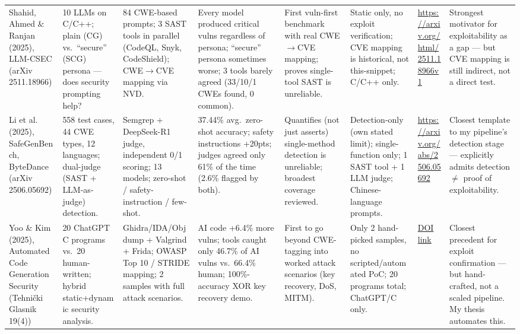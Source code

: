 \documentclass[10pt]{article}
\begin{document}
\begin{landscape}
\begin{longtable}{
  P{2.6cm}
  P{3.6cm}
  P{3.2cm}
  P{4.0cm}
  P{3.0cm}
  P{3.0cm}
  P{2.2cm}
  P{3.6cm}
}
Shahid, Ahmed \& Ranjan (2025), LLM-CSEC (arXiv 2511.18966)
&
10 LLMs on C/C++; plain (CG) vs.\ ``secure'' (SCG) persona --- does security prompting help?
&
84 CWE-based prompts; 3 SAST tools in parallel (CodeQL, Snyk, CodeShield); CWE$\to$CVE mapping via NVD.
&
Every model produced critical vulns regardless of persona; ``secure'' persona sometimes worse; 3 tools barely agreed (33/10/1 CWEs found, 0 common).
&
First vuln-first benchmark with real CWE$\to$CVE mapping; proves single-tool SAST is unreliable.
&
Static only, no exploit verification; CVE mapping is historical, not this-snippet; C/C++ only.
&
\url{https://arxiv.org/html/2511.18966v1}
&
Strongest motivator for exploitability as a gap --- but CVE mapping is still indirect, not a direct test.
\\[4pt]

Li et al. (2025), SafeGenBench, ByteDance (arXiv 2506.05692)
&
558 test cases, 44 CWE types, 12 languages; dual-judge (SAST + LLM-as-judge) detection.
&
Semgrep + DeepSeek-R1 judge, independent 0/1 scoring; 13 models; zero-shot / safety-instruction / few-shot.
&
37.44\% avg.\ zero-shot accuracy; safety instructions +20pts; judges agreed only 61\% of the time (2.6\% flagged by both).
&
Quantifies (not just asserts) single-method detection is unreliable; broadest coverage reviewed.
&
Detection-only (own stated limit); single-function only; 1 SAST tool + 1 LLM judge; Chinese-language prompts.
&
\url{https://arxiv.org/abs/2506.05692}
&
Closest template to my pipeline's detection stage --- explicitly admits detection $\neq$ proof of exploitability.
\\[4pt]

Yoo \& Kim (2025), Automated Code Generation Security (Tehni\v{c}ki Glasnik 19(4))
&
20 ChatGPT C programs vs.\ 20 human-written; hybrid static+dynamic security analysis.
&
Ghidra/IDA/Objdump + Valgrind + Frida; OWASP Top 10 / STRIDE mapping; 2 samples with full attack scenarios.
&
AI code +6.4\% more vulns; tools caught only 46.7\% of AI vulns vs.\ 66.4\% human; 100\%-accuracy XOR key recovery demo.
&
First to go beyond CWE-tagging into worked attack scenarios (key recovery, DoS, MITM).
&
Only 2 hand-picked samples, no scripted/automated PoC; 20 programs total; ChatGPT/C only.
&
\href{https://doi.org/10.31803/tg-20250225095135}{DOI link}
&
Closest precedent for exploit confirmation --- but hand-crafted, not a scaled pipeline. My thesis automates this.
\\[4pt]


\end{longtable}
\end{landscape}
\end{document}
